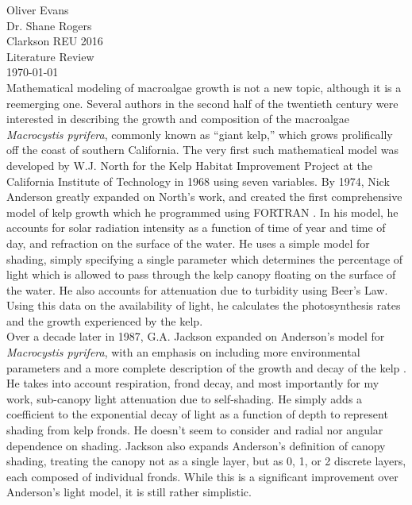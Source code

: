\documentclass{article}
\begin{document}
\noindent
Oliver Evans \\
Dr. Shane Rogers  \\
Clarkson REU 2016 \\
Literature Review \\
\today \\[-0.75em]

Mathematical modeling of macroalgae growth is not a new topic, although it is a reemerging one.
Several authors in the second half of the twentieth century were interested in describing the growth and composition of the macroalgae \textit{Macrocystis pyrifera}, commonly known as ``giant kelp,'' which grows prolifically off the coast of southern California.
The very first such mathematical model was developed by W.J. North for the Kelp Habitat Improvement Project at the California Institute of Technology in 1968 using seven variables.
By 1974, Nick Anderson greatly expanded on North's work, and created the first comprehensive model of kelp growth which he programmed using FORTRAN \citep{anderson_mathematical_1974}.
In his model, he accounts for solar radiation intensity as a function of time of year and time of day, and refraction on the surface of the water.
He uses a simple model for shading, simply specifying a single parameter which determines the percentage of light which is allowed to pass through the kelp canopy floating on the surface of the water.
He also accounts for attenuation due to turbidity using Beer's Law.
Using this data on the availability of light, he calculates the photosynthesis rates and the growth experienced by the kelp. \\[-0.75em]

Over a decade later in 1987, G.A.
Jackson expanded on Anderson's model for \textit{Macrocystis pyrifera}, with an emphasis on including more environmental parameters and a more complete description of the growth and decay of the kelp \citep{jackson_modelling_1987}. 
He takes into account respiration, frond decay, and most importantly for my work, sub-canopy light attenuation due to self-shading.
He simply adds a coefficient to the exponential decay of light as a function of depth to represent shading from kelp fronds.
He doesn't seem to consider and radial nor angular dependence on shading.
Jackson also expands Anderson's definition of canopy shading, treating the canopy not as a single layer, but as 0, 1, or 2 discrete layers, each composed of individual fronds.
While this is a significant improvement over Anderson's light model, it is still rather simplistic. \\[-0.75em]
\end{document}
